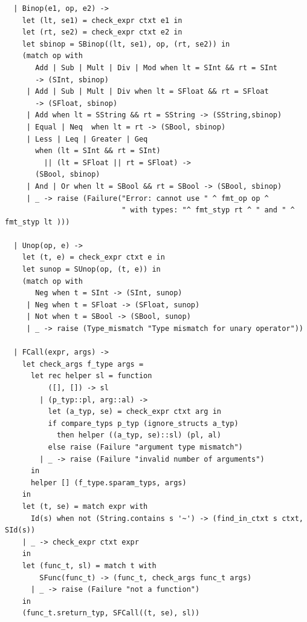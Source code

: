 \documentclass[12pt]{article}
\begin{document}
\begin{mdframed}[hidealllines=true,backgroundcolor=blue!20]
\begin{lstlisting}
  | Binop(e1, op, e2) ->
    let (lt, se1) = check_expr ctxt e1 in
    let (rt, se2) = check_expr ctxt e2 in
    let sbinop = SBinop((lt, se1), op, (rt, se2)) in
    (match op with
       Add | Sub | Mult | Div | Mod when lt = SInt && rt = SInt 
       -> (SInt, sbinop)
     | Add | Sub | Mult | Div when lt = SFloat && rt = SFloat 
       -> (SFloat, sbinop)
     | Add when lt = SString && rt = SString -> (SString,sbinop)
     | Equal | Neq  when lt = rt -> (SBool, sbinop)
     | Less | Leq | Greater | Geq  
       when (lt = SInt && rt = SInt) 
         || (lt = SFloat || rt = SFloat) -> 
       (SBool, sbinop)
     | And | Or when lt = SBool && rt = SBool -> (SBool, sbinop)
     | _ -> raise (Failure("Error: cannot use " ^ fmt_op op ^ 
                           " with types: "^ fmt_styp rt ^ " and " ^ fmt_styp lt )))

  | Unop(op, e) -> 
    let (t, e) = check_expr ctxt e in 
    let sunop = SUnop(op, (t, e)) in
    (match op with 
       Neg when t = SInt -> (SInt, sunop)
     | Neg when t = SFloat -> (SFloat, sunop)
     | Not when t = SBool -> (SBool, sunop)
     | _ -> raise (Type_mismatch "Type mismatch for unary operator"))

  | FCall(expr, args) ->
    let check_args f_type args =
      let rec helper sl = function
          ([], []) -> sl
        | (p_typ::pl, arg::al) ->
          let (a_typ, se) = check_expr ctxt arg in
          if compare_typs p_typ (ignore_structs a_typ) 
            then helper ((a_typ, se)::sl) (pl, al)
          else raise (Failure "argument type mismatch")
        | _ -> raise (Failure "invalid number of arguments")
      in
      helper [] (f_type.sparam_typs, args)
    in
    let (t, se) = match expr with
      Id(s) when not (String.contains s '~') -> (find_in_ctxt s ctxt, SId(s))
    | _ -> check_expr ctxt expr 
    in
    let (func_t, sl) = match t with
        SFunc(func_t) -> (func_t, check_args func_t args)
      | _ -> raise (Failure "not a function")
    in
    (func_t.sreturn_typ, SFCall((t, se), sl))


\end{lstlisting}
\end{mdframed}
\end{document}
